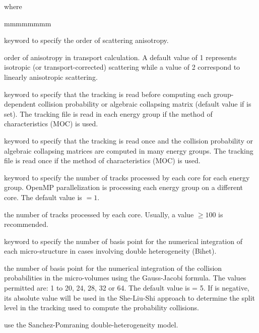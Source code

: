 \noindent
where

\begin{ListeDeDescription}{mmmmmmmm}

\item[\moc{ANIS}] keyword to specify the order of scattering anisotropy. 

\item[\dusa{nanis}] order of anisotropy in transport calculation.
A default value of 1 represents isotropic (or transport-corrected) scattering while a value of 2
correspond to linearly anisotropic scattering.

\item[\moc{ONEG}] keyword to specify that the tracking is read before computing each group-dependent collision
probability or algebraic collapsing matrix (default value if  is set). The tracking file is
read in each energy group if the method of characteristics (MOC) is used.

\item[\moc{ALLG}] keyword to specify that the tracking is read once and the collision
probability or algebraic collapsing matrices are computed in many energy groups.  The tracking file is
read once if the method of characteristics (MOC) is used.

\item[\moc{BATCH}] keyword to specify the number of tracks processed by each core for each energy group. OpenMP parallelization is processing each energy group on a different core. The default value is  $=1$.

\item[\dusa{nbatch}] the number of tracks processed by each core. Usually, a value  $\ge 100$ is recommended.

\item[\moc{QUAB}] keyword to specify the number of basis point for the
numerical integration of each micro-structure in cases involving double
heterogeneity (Bihet).

\item[\dusa{iquab}] the number of basis point for the numerical integration of
the collision probabilities in the micro-volumes using the Gauss-Jacobi
formula. The values permitted are: 1 to 20, 24, 28, 32 or 64. The default value
is  = 5. If  is negative, its absolute value will be used in the She-Liu-Shi approach to determine the
split level in the tracking used to compute the probability collisions.

\item[\moc{SAPO}] use the Sanchez-Pomraning double-heterogeneity model.\cite{sapo}


\end{ListeDeDescription}
